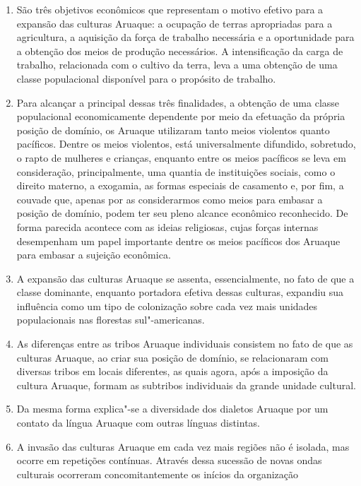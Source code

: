 \begin{enumerate}
\def\labelenumi{\arabic{enumi}.}
\setcounter{enumi}{4}
\item
  São três objetivos econômicos que representam o motivo efetivo para a
  expansão das culturas Aruaque: a ocupação de terras apropriadas para a
  agricultura, a aquisição da força de trabalho necessária e a
  oportunidade para a obtenção dos meios de produção necessários. A
  intensificação da carga de trabalho, relacionada com o cultivo da
  terra, leva a uma obtenção de uma classe populacional disponível para
  o propósito de trabalho.
\item
  Para alcançar a principal dessas três finalidades, a obtenção de uma
  classe populacional economicamente dependente por meio da efetuação da
  própria posição de domínio, os Aruaque utilizaram tanto meios
  violentos quanto pacíficos. Dentre os meios violentos, está
  universalmente difundido, sobretudo, o rapto de mulheres e crianças,
  enquanto entre os meios pacíficos se leva em consideração,
  principalmente, uma quantia de instituições sociais, como o direito
  materno, a exogamia, as formas especiais de casamento e, por fim, a
  couvade que, apenas por as considerarmos como meios para embasar a
  posição de domínio, podem ter seu pleno alcance econômico reconhecido.
  De forma parecida acontece com as ideias religiosas, cujas forças
  internas desempenham um papel importante dentre os meios pacíficos
  dos Aruaque para embasar a sujeição econômica.
\item
  A expansão das culturas Aruaque se assenta, essencialmente, no fato de
  que a classe dominante, enquanto portadora efetiva dessas culturas,
  expandiu sua influência como um tipo de colonização sobre cada vez
  mais unidades populacionais nas florestas sul"-americanas.
\item
  As diferenças entre as tribos Aruaque individuais consistem no fato de
  que as culturas Aruaque, ao criar sua posição de domínio, se
  relacionaram com diversas tribos em locais diferentes, as quais
  agora, após a imposição da cultura Aruaque, formam as subtribos
  individuais da grande unidade cultural.
\item
  Da mesma forma explica"-se a diversidade dos dialetos Aruaque por um
  contato da língua Aruaque com outras línguas distintas.
\item
  A invasão das culturas Aruaque em cada vez mais regiões não é isolada,
  mas ocorre em repetições contínuas. Através dessa sucessão de novas
  ondas culturais ocorreram concomitantemente os inícios da organização

\end{enumerate}
